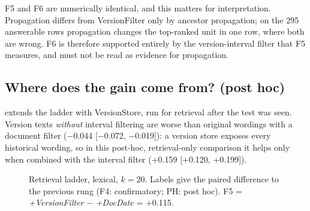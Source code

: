 \documentclass[conference]{IEEEtran}
\newcommand{\sys}[1]{\textsf{#1}}
\begin{document}
F5 and F6 are numerically identical, and this matters for interpretation. \sys{Propagation} differs from \sys{VersionFilter} only by ancestor propagation; on the 295 answerable rows propagation changes the top-ranked unit in one row, where both are wrong. F6 is therefore supported entirely by the version-interval filter that F5 measures, and must not be read as evidence for propagation.

\subsection{Where does the gain come from? (post hoc)}

 extends the ladder with \sys{VersionStore}, run for retrieval after the test was seen. Version texts \emph{without} interval filtering are worse than original wordings with a document filter ($-$0.044 [$-$0.072, $-$0.019]): a version store exposes every historical wording, so in this post-hoc, retrieval-only comparison it helps only when combined with the interval filter ($+$0.159 [$+$0.120, $+$0.199]).

\begin{figure}[t]
\centering
{}
\caption{Retrieval ladder, lexical, $k=20$. Labels give the paired difference to the previous rung (F4: confirmatory; PH: post hoc). F5 = \textit{+VersionFilter} $-$ \textit{+DocDate} = $+$0.115.}
\label{fig:ladder}
\end{figure}
\end{document}
